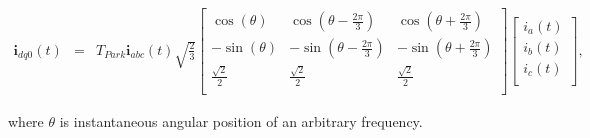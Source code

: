\begin{equation}
        \begin{array}{rcl}
            \textbf{i}_{dq0}(t)&=&T_{Park}\textbf{i}_{abc}(t)
            \sqrt{\frac{2}{3}}\begin{bmatrix}
            \cos(\theta)& \cos(\theta-\frac{2\pi}{3})& \cos(\theta+\frac{2\pi}{3})\\
            -\sin(\theta)& -\sin(\theta-\frac{2\pi}{3})& -\sin(\theta+\frac{2\pi}{3})\\
            \frac{\sqrt{2}}{2}& \frac{\sqrt{2}}{2}& \frac{\sqrt{2}}{2}\\
            \end{bmatrix}
            \begin{bmatrix}
            i_a(t)\\
            i_b(t)\\
            i_c(t)\\
            \end{bmatrix},
        \end{array}
        \label{BASICCSR:eqn:Park}
    \end{equation}

    where $\theta$ is instantaneous angular position of an arbitrary frequency.
